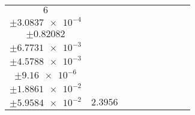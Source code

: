 \documentclass[8pt]{article}
\begin{document}
\begin{longtable}[l]{c c c c c c c c c}
$\num{6}$ & \begin{tabular}[c]{@{}c@{}}$\num{3.3358e-2}$ \\ $\pm\num{3.0837e-4}$\end{tabular} & \begin{tabular}[c]{@{}c@{}}$\num{1.7427}$ \\ $\pm\num{0.82082}$\end{tabular} & \begin{tabular}[c]{@{}c@{}}$\num{7.4917}$ \\ $\pm\num{6.7731e-3}$\end{tabular} & \begin{tabular}[c]{@{}c@{}}$\num{2.9641e+3}$ \\ $\pm\num{4.5788e-3}$\end{tabular} & \begin{tabular}[c]{@{}c@{}}$\num{5.9299}$ \\ $\pm\num{9.16e-6}$\end{tabular} & \begin{tabular}[c]{@{}c@{}}$\num{2.6247}$ \\ $\pm\num{1.8861e-2}$\end{tabular} & \begin{tabular}[c]{@{}c@{}}$\num{4.9293}$ \\ $\pm\num{5.9584e-2}$\end{tabular} & $\num{2.3956}$\\
\bottomrule
\end{longtable}
\end{document}
